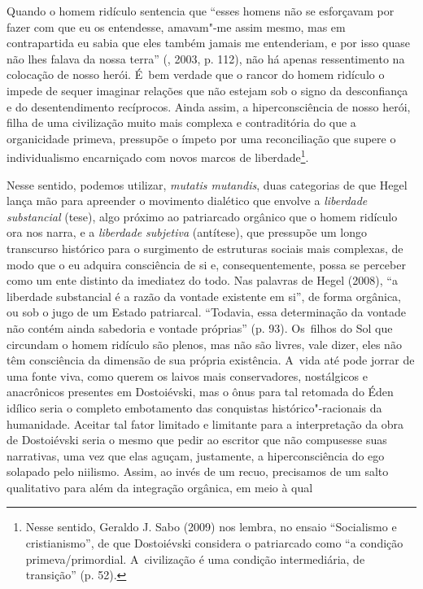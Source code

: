 Quando o homem ridículo sentencia que ``esses homens não se esforçavam
por fazer com que eu os entendesse, amavam"-me assim mesmo, mas em
contrapartida eu sabia que eles também jamais me entenderiam, e por isso
quase não lhes falava da nossa terra'' (, 2003, p. 112), não
há apenas ressentimento na colocação de nosso herói. É~bem verdade que o
rancor do homem ridículo o impede de sequer imaginar relações que não
estejam sob o signo da desconfiança e do desentendimento recíprocos.
Ainda assim, a hiperconsciência de nosso herói, filha de uma civilização
muito mais complexa e contraditória do que a organicidade primeva,
pressupõe o ímpeto por uma reconciliação que supere o individualismo
encarniçado com novos marcos de liberdade\footnote{Nesse sentido,
  Geraldo J. Sabo (2009) nos lembra, no ensaio ``Socialismo e
  cristianismo'', de que Dostoiévski considera o patriarcado como ``a
  condição primeva/primordial. A~civilização é uma condição
  intermediária, de transição'' (p. 52).}.

Nesse sentido, podemos utilizar, \emph{mutatis mutandis}, duas
categorias de que Hegel lança mão para apreender o movimento dialético
que envolve a \emph{liberdade substancial} (tese), algo próximo ao
patriarcado orgânico que o homem ridículo ora nos narra, e a
\emph{liberdade subjetiva} (antítese), que pressupõe um longo transcurso
histórico para o surgimento de estruturas sociais mais complexas, de
modo que o eu adquira consciência de si e, consequentemente, possa se
perceber como um ente distinto da imediatez do todo. Nas palavras de
Hegel (2008), ``a liberdade substancial é a razão da vontade existente
em si'', de forma orgânica, ou sob o jugo de um Estado patriarcal.
``Todavia, essa determinação da vontade não contém ainda sabedoria e
vontade próprias'' (p. 93). Os~filhos do Sol que circundam o homem
ridículo são plenos, mas não são livres, vale dizer, eles não têm
consciência da dimensão de sua própria existência. A~vida até pode
jorrar de uma fonte viva, como querem os laivos mais conservadores,
nostálgicos e anacrônicos presentes em Dostoiévski, mas o ônus para tal
retomada do Éden idílico seria o completo embotamento das conquistas
histórico"-racionais da humanidade. Aceitar tal fator limitado e
limitante para a interpretação da obra de Dostoiévski seria o mesmo que
pedir ao escritor que não compusesse suas narrativas, uma vez que elas
aguçam, justamente, a hiperconsciência do ego solapado pelo niilismo.
Assim, ao invés de um recuo, precisamos de um salto qualitativo para
além da integração orgânica, em meio à qual

